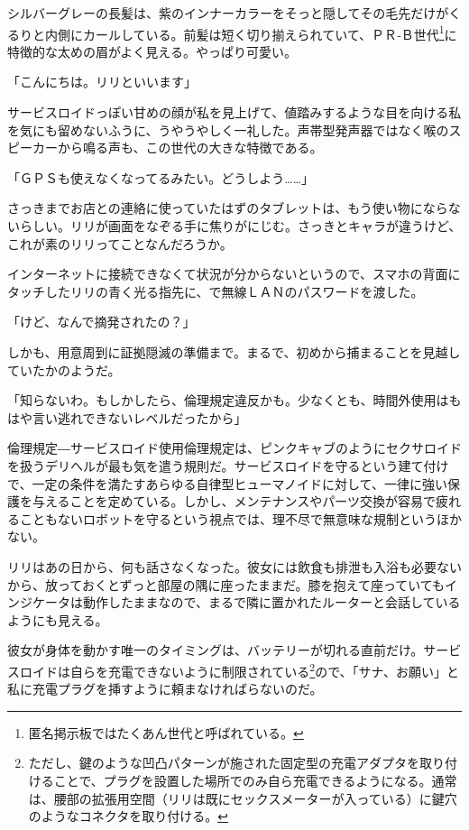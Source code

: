 
シルバーグレーの長髪は、紫のインナーカラーをそっと隠してその毛先だけがくるりと内側にカールしている。前髪は短く切り揃えられていて、ＰＲ‐Ｂ世代\footnote{匿名掲示板ではたくあん世代と呼ばれている。}に特徴的な太めの眉がよく見える。やっぱり可愛い。

「こんにちは。リリといいます」

サービスロイドっぽい甘めの顔が私を見上げて、値踏みするような目を向ける私を気にも留めないふうに、うやうやしく一礼した。声帯型発声器ではなく喉のスピーカーから鳴る声も、この世代の大きな特徴である。

\sectionbreak

「ＧＰＳも使えなくなってるみたい。どうしよう……」

さっきまでお店との連絡に使っていたはずのタブレットは、もう使い物にならないらしい。リリが画面をなぞる手に焦りがにじむ。さっきとキャラが違うけど、これが素のリリってことなんだろうか。

インターネットに接続できなくて状況が分からないというので、スマホの背面にタッチしたリリの青く光る指先に、で無線ＬＡＮのパスワードを渡した。

「けど、なんで摘発されたの？」

しかも、用意周到に証拠隠滅の準備まで。まるで、初めから捕まることを見越していたかのようだ。

「知らないわ。もしかしたら、倫理規定違反かも。少なくとも、時間外使用はもはや言い逃れできないレベルだったから」

倫理規定\――サービスロイド使用倫理規定は、ピンクキャブのようにセクサロイドを扱うデリヘルが最も気を遣う規則だ。サービスロイドを守るという建て付けで、一定の条件を満たすあらゆる自律型ヒューマノイドに対して、一律に強い保護を与えることを定めている。しかし、メンテナンスやパーツ交換が容易で疲れることもないロボットを守るという視点では、理不尽で無意味な規制というほかない。

\sectionbreak

リリはあの日から、何も話さなくなった。彼女には飲食も排泄も入浴も必要ないから、放っておくとずっと部屋の隅に座ったままだ。膝を抱えて座っていてもインジケータは動作したままなので、まるで隣に置かれたルーターと会話しているようにも見える。

彼女が身体を動かす唯一のタイミングは、バッテリーが切れる直前だけ。サービスロイドは自らを充電できないように制限されている\footnote{ただし、鍵のような凹凸パターンが施された固定型の充電アダプタを取り付けることで、プラグを設置した場所でのみ自ら充電できるようになる。通常は、腰部の拡張用空間（リリは既にセックスメーターが入っている）に鍵穴のようなコネクタを取り付ける。}ので、「サナ、お願い」と私に充電プラグを挿すように頼まなければらないのだ。

